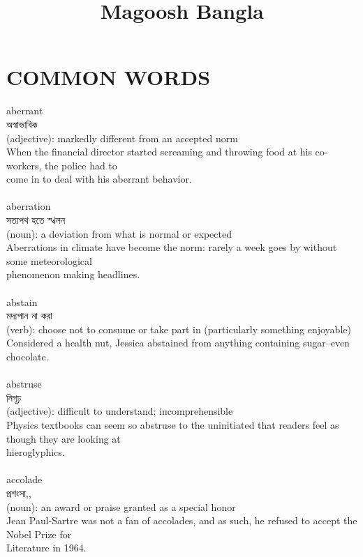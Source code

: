 \documentclass{article}
\begin{document}
 

\title{Magoosh Bangla}
\maketitle



\section{COMMON WORDS}
{aberrant}\\
{অস্বাভাবিক}\\
{(adjective): markedly different from an accepted norm\\When the financial director started screaming and throwing food at his co-workers, the police had to\\come in to deal with his aberrant behavior.\\}\\
{aberration}\\
{সত্যপথ হতে স্খলন}\\
{(noun): a deviation from what is normal or expected\\Aberrations in climate have become the norm: rarely a week goes by without some meteorological\\phenomenon making headlines.\\}\\
{abstain}\\
{মদ্যপান না করা}\\
{(verb): choose not to consume or take part in (particularly something enjoyable)\\Considered a health nut, Jessica abstained from anything containing sugar--even chocolate.\\}\\
{abstruse}\\
{নিগূঢ়}\\
{(adjective): difficult to understand; incomprehensible\\Physics textbooks can seem so abstruse to the uninitiated that readers feel as though they are looking at\\hieroglyphics.\\}\\
{accolade}\\
{প্রশংসা,,}\\
{(noun): an award or praise granted as a special honor\\Jean Paul-Sartre was not a fan of accolades, and as such, he refused to accept the Nobel Prize for\\Literature in 1964.\\}\\
\end{document}
